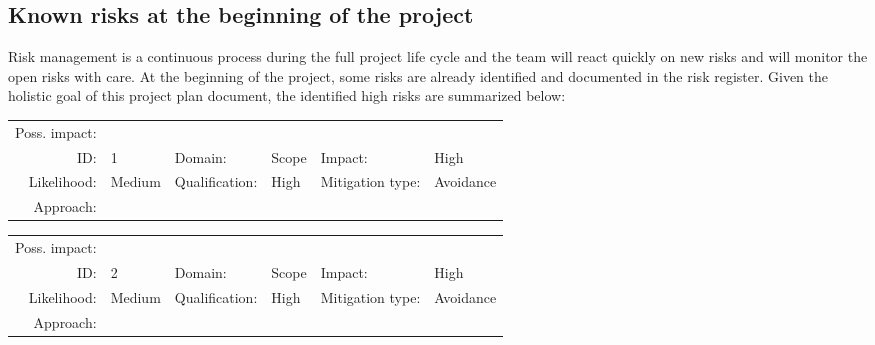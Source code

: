 \subsection{Known risks at the beginning of the project}
Risk management is a continuous process during the full project life cycle and the team will react quickly on new risks and will monitor the open risks with care.
At the beginning of the project, some risks are already identified and documented in the risk register.
Given the holistic goal of this project plan document, the identified high risks are summarized below:

\begin{longtable}{R}
\hline
{}                                    \\\hline
Poss. impact:    &                     \\\hline
ID:  & 1        & Domain:        & Scope     & Impact:           & High      \\\hline
Likelihood:      & Medium   & Qualification: & High      & Mitigation type:  & Avoidance \\\hline
Approach:        &  \\\hline
\end{longtable}

\begin{longtable}{R}
\hline
{} \\\hline
Poss. impact:   &     \\\hline
ID: & 2         & Domain:       & Scope    & Impact: & High     \\\hline
Likelihood:     & Medium    & Qualification:            & High     & Mitigation type:    & Avoidance    \\\hline
Approach:       &  \\\hline
\end{longtable}

